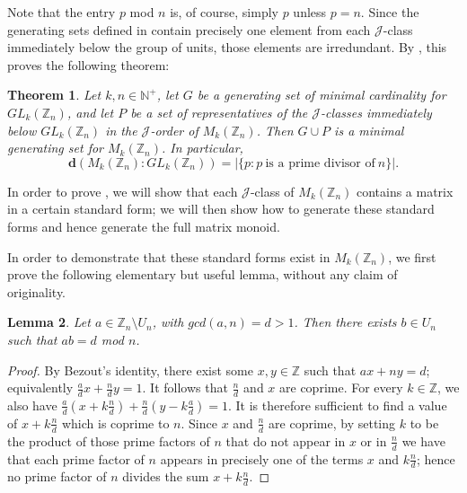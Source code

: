\documentclass[11pt]{article}
\newtheorem{thm}{Theorem}[subsection]
\newtheorem{lemma}[thm]{Lemma}
\numberwithin{equation}{section}
\newcommand{\set}[2]{\ensuremath{\{#1 : #2 \}}}
\newcommand{\J}{\mathscr{J}}
\newcommand{\N}{\mathbb{N}}
\newcommand{\Np}{\N^{+}}
\newcommand{\Z}{\mathbb{Z}}
\renewcommand{\d}{\mathbf{d}}
\begin{document}
Note that the entry $p$ mod $n$ is, of course, simply $p$ unless $p = n$. Since
the generating sets defined in  contain precisely one
element from each $\J$-class immediately below the group of units, those
elements are irredundant. By , this proves the following
theorem:
\begin{thm}
  Let $k,n \in \Np$, let $G$ be a generating set of minimal cardinality for
  $GL_k(\Z_n)$, and let $P$ be a set of representatives of the
  $\J$-classes immediately below $GL_k(\Z_n)$ in the $\J$-order of
  $M_k(\Z_n)$. Then $G \cup P$ is a minimal generating set for $M_k(\Z_n)$.
  In particular,
  $$\d(M_k(\Z_n) : GL_k(\Z_n))
                       =
                       |\set{p}{p\ \text{is a prime divisor of}\ n}|.
  $$
\end{thm}

In order to prove , we will show that each $\J$-class of
$M_k(\Z_n)$ contains a matrix in a certain standard form; we will then show how
to generate these standard forms and hence generate the full matrix monoid.

In order to demonstrate that these standard forms exist in $M_k(\Z_n)$, we first
prove the following elementary but useful lemma, without any claim of
originality.

\begin{lemma}
  Let $a \in \Z_n \setminus U_n$, with $gcd(a, n) = d > 1$. Then there exists $b
  \in U_n$ such that $ab = d$ mod $n$.
\end{lemma}
\begin{proof}
  By Bezout's identity, there exist some $x, y \in \Z$ such that $ax + ny = d$;
  equivalently $\frac{a}{d}x + \frac{n}{d}y = 1$. It follows that
  $\frac{n}{d}$ and $x$ are coprime. For every $k \in \Z$, we also have
  $\frac{a}{d}(x + k\frac{n}{d}) + \frac{n}{d}(y - k\frac{a}{d}) = 1$. It is
  therefore sufficient to find a value of $x + k\frac{n}{d}$ which is coprime to
  $n$. Since $x$ and $\frac{n}{d}$ are coprime, by setting $k$ to be the product
  of those prime factors of $n$ that do not appear in $x$ or in $\frac{n}{d}$ we
  have that each prime factor of $n$ appears in precisely one of the terms $x$
  and $k\frac{n}{d}$; hence no prime factor of $n$ divides the sum $x +
  k\frac{n}{d}$.
\end{proof}
\end{document}

